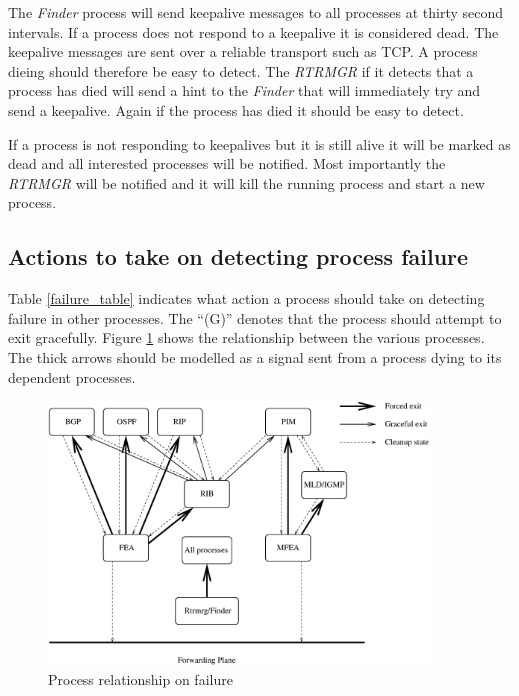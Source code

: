 \documentclass[11pt]{article}
\makeatletter
\newcommand{\finder} {{\em Finder}\@\xspace}
\newcommand{\rtrmgr} {{\em RTRMGR}\@\xspace}
\makeatother
\begin{document}
The \finder process will send keepalive messages to all processes at
thirty second intervals. If a process does not respond to a keepalive
it is considered dead. The keepalive messages are sent over a reliable
transport such as TCP. A process dieing should therefore be easy to
detect. The \rtrmgr if it detects that a process has died will send a
hint to the \finder that will immediately try and send a keepalive.
Again if the process has died it should be easy to detect.

If a process is not responding to keepalives but it is still alive it
will be marked as dead and all interested processes will be notified.
Most importantly the \rtrmgr will be notified and it will kill the
running process and start a new process.

\subsection{Actions to take on detecting process failure}

Table \ref{failure_table} indicates what action a process should take
on detecting failure in other processes. The ``(G)'' denotes that the
process should attempt to exit gracefully. Figure \ref{failure_fig}
shows the relationship between the various processes. The thick arrows
should be modelled as a signal sent from a process dying to its
dependent processes.

\begin{figure}
  \begin{center}
    \includegraphics[width=0.9\textwidth]{figs/error_dependency.eps}
    \caption{Process relationship on failure}
    \label{failure_fig}
  \end{center}
\end{figure}
\end{document}
